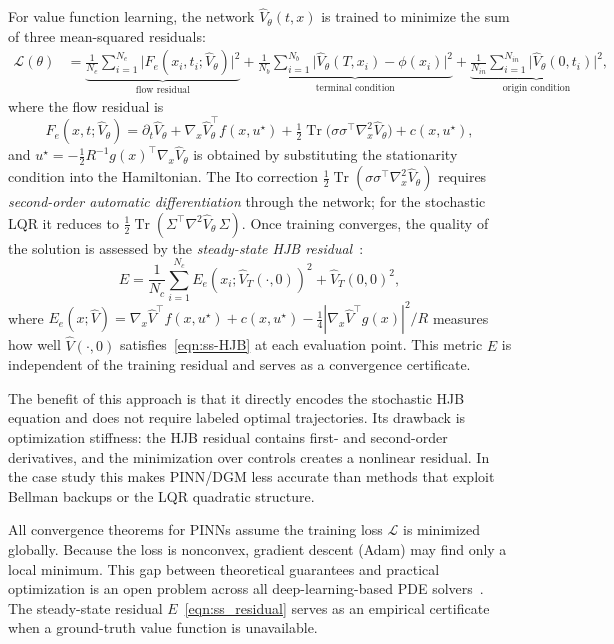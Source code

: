 For value function learning, the network $\hat V_\theta(t,x)$ is trained
to minimize the sum of three mean-squared residuals:
\begin{align}
  \mathcal{L}(\theta) &=
  \underbrace{\frac{1}{N_e}\sum_{i=1}^{N_e}
    \bigl|F_e(x_i,t_i;\hat V_\theta)\bigr|^2}_{\text{flow residual}}
  +\underbrace{\frac{1}{N_b}\sum_{i=1}^{N_b}
    \bigl|\hat V_\theta(T,x_i)-\phi(x_i)\bigr|^2}_{\text{terminal condition}}
  +\underbrace{\frac{1}{N_{in}}\sum_{i=1}^{N_{in}}
    \bigl|\hat V_\theta(0,t_i)\bigr|^2}_{\text{origin condition}},
  \label{eqn:pinn_loss}
\end{align}
where the flow residual is
\begin{equation}
  F_e(x,t;\hat V_\theta)=\partial_t\hat V_\theta
    +\nabla_x\hat V_\theta^\top f(x,u^\star)
    +\tfrac{1}{2}\operatorname{Tr}\!\bigl(\sigma\sigma^\top\nabla_x^2\hat V_\theta\bigr)
    +c(x,u^\star),
    \label{eqn:flow_residual}
\end{equation}
and $u^\star=-\frac{1}{2}R^{-1}g(x)^\top\nabla_x\hat V_\theta$ is obtained
by substituting the stationarity condition into the Hamiltonian.
The Ito correction $\frac{1}{2}\operatorname{Tr}(\sigma\sigma^\top\nabla_x^2\hat V_\theta)$
requires \emph{second-order automatic differentiation} through the network;
for the stochastic LQR it reduces to $\frac{1}{2}\operatorname{Tr}(\Sigma^\top\nabla^2\hat V_\theta\,\Sigma)$.
Once training converges, the quality of the solution is assessed by the
\emph{steady-state HJB residual}~\cite{fotiadis2025pinn}:
\begin{equation}\label{eqn:ss_residual}
  E = \frac{1}{N_c}\sum_{i=1}^{N_c}
  E_e(x_i;\hat V_T(\cdot,0))^2 + \hat V_T(0,0)^2,
\end{equation}
where $E_e(x;\hat V)=\nabla_x\hat V^\top f(x,u^\star)+c(x,u^\star)
-\frac{1}{4}|\nabla_x\hat V^\top g(x)|^2/R$
measures how well $\hat V(\cdot,0)$ satisfies~\eqref{eqn:ss-HJB}
at each evaluation point.  This metric $E$ is independent of the training
residual and serves as a convergence certificate.

The benefit of this approach is that it directly encodes the stochastic HJB equation and does not require labeled optimal trajectories. Its drawback is optimization stiffness: the HJB residual contains first- and second-order derivatives, and the minimization over controls creates a nonlinear residual. In the case study this makes PINN/DGM less accurate than methods that exploit Bellman backups or the LQR quadratic structure.

\begin{remark}
All convergence theorems for PINNs assume the training loss $\mathcal{L}$
is minimized globally.  Because the loss is nonconvex, gradient descent
(Adam) may find only a local minimum.  This gap between theoretical
guarantees and practical optimization is an open problem across all
deep-learning-based PDE solvers~\cite{han2018solving,fotiadis2025pinn}.
The steady-state residual $E$~\eqref{eqn:ss_residual} serves as an
empirical certificate when a ground-truth value function is unavailable.
\end{remark}
